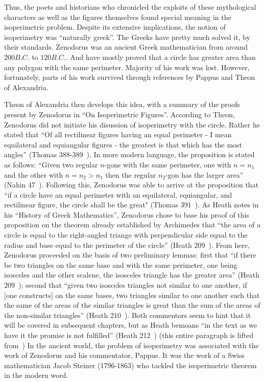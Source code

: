 \documentclass[a4paper]{book}
\numberwithin{theorem}{section}%
\begin{document}
\leavevmode
\newline
\newline
Thus, the poets and historians who chronicled the exploits of these mythological characters as well as the figures themselves found special meaning in the isoperimetric problem. Despite its extensive implications, the notion of isoperimetry was ``naturally greek''. The Greeks have pretty much solved it, by their standards. Zenodorus was an ancient Greek mathematician from around $200B.C.$ to $120B.C.$. And have mostly proved that a circle has greater area than any polygon with the same perimeter. Majority of his work was lost. However, fortunately, parts of his work survived through references by Pappus and Theon of Alexandria.

Theon of Alexandria then develops this idea, with a summary of the proofs present by Zenodorus in ``On Isoperimetric Figures''. According to Theon, Zenodorus did not initiate his disussion of isoperimetry with the circle. Rather he stated that ``Of all rectilinear figures having an equal perimeter - I mean equilateral and equiangular figures - the greatest is that which has the most angles'' (Thomas 388-389~\citep{ivor1941selections}). In more modern language, the proposition is stated as follows: ``Given two regular $n$-gons with the same perimeter, one with $n=n_1$ and the other with $n=n_2>n_1$ then the regular $n_2$-gon has the larger area'' (Nahin 47~\citep{nahin2021least}). Following this, Zenodorus was able to arrive at the proposition that ``if a circle have an equal perimeter with an equilateral, equiangular, and rectilinear figure, the circle shall be the great" (Thomas 391~\citep{ivor1941selections}). As Heath notes in his ``History of Greek Mathematics'', Zenodorus chose to base his proof of this proposition on the theorem already established by Archimedes that ``the area of a circle is equal to the right-angled triange with perpendicular side equal to the radius and base equal to the perimeter of the circle'' (Heath 209~\citep{heath2013history}). From here, Zenodorus proceeded on the basis of two preliminary lemmas: first that ``if there be two triangles on the same base and with the same perimeter, one being isosceles and the other scalene, the isosceles triangle has the greater area'' (Heath 209~\citep{heath2013history}); second that ``given two isosceles triangles not similar to one another, if [one constructs] on the same bases, two triangles similar to one another such that the same of the areas of the similar triangles is great than the sum of the areas of the non-similar triangles'' (Heath 210~\citep{heath2013history}). Both commentors seem to hint that it will be covered in subsequent chapters, but as Heath bemoans ``in the text as we have it the promise is not fulfilled'' (Heath 212~\citep{heath2013history}) (this entire paragraph is lifted from~\citep{wiegert2010sagacity})
\newline
\newline
In the ancient world, the problem of isoperimetry was associated with the work of Zenodorus and his commentator, Pappus. It was the work of a Swiss mathematician Jacob Steiner (1796-1863) who tackled the isoperimetric theorem in the modern word.
\end{document}
